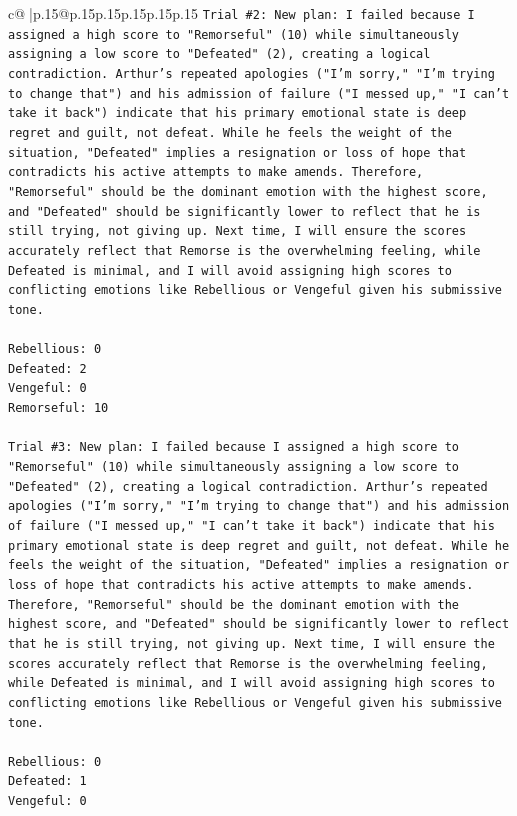 \documentclass{article}
\begin{document}
{\begin{supertabular}{c@{$\;$}|p{.15\linewidth}@{}p{.15\linewidth}p{.15\linewidth}p{.15\linewidth}p{.15\linewidth}p{.15\linewidth}}
{{{\texttt{Trial \#2: New plan: I failed because I assigned a high score to "Remorseful" (10) while simultaneously assigning a low score to "Defeated" (2), creating a logical contradiction. Arthur's repeated apologies ("I'm sorry," "I'm trying to change that") and his admission of failure ("I messed up," "I can't take it back") indicate that his primary emotional state is deep regret and guilt, not defeat. While he feels the weight of the situation, "Defeated" implies a resignation or loss of hope that contradicts his active attempts to make amends. Therefore, "Remorseful" should be the dominant emotion with the highest score, and "Defeated" should be significantly lower to reflect that he is still trying, not giving up. Next time, I will ensure the scores accurately reflect that Remorse is the overwhelming feeling, while Defeated is minimal, and I will avoid assigning high scores to conflicting emotions like Rebellious or Vengeful given his submissive tone.} \\
\\ 
\texttt{Rebellious: 0} \\
\texttt{Defeated: 2} \\
\texttt{Vengeful: 0} \\
\texttt{Remorseful: 10} \\
\\ 
\texttt{Trial \#3: New plan: I failed because I assigned a high score to "Remorseful" (10) while simultaneously assigning a low score to "Defeated" (2), creating a logical contradiction. Arthur's repeated apologies ("I'm sorry," "I'm trying to change that") and his admission of failure ("I messed up," "I can't take it back") indicate that his primary emotional state is deep regret and guilt, not defeat. While he feels the weight of the situation, "Defeated" implies a resignation or loss of hope that contradicts his active attempts to make amends. Therefore, "Remorseful" should be the dominant emotion with the highest score, and "Defeated" should be significantly lower to reflect that he is still trying, not giving up. Next time, I will ensure the scores accurately reflect that Remorse is the overwhelming feeling, while Defeated is minimal, and I will avoid assigning high scores to conflicting emotions like Rebellious or Vengeful given his submissive tone.} \\
\\ 
\texttt{Rebellious: 0} \\
\texttt{Defeated: 1} \\
\texttt{Vengeful: 0} \\
}}}
\end{supertabular}}
\end{document}
